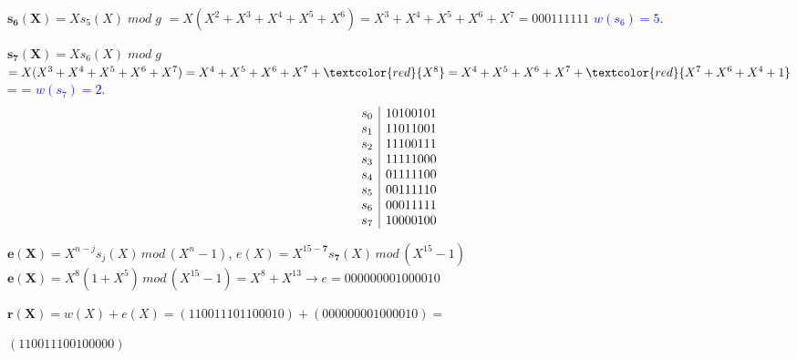 \documentclass{beamer}
\theoremstyle{plain}
\theoremstyle{example}
\theoremstyle{example}
\begin{document}
\begin{frame}  \footnotesize  

\vspace{0.3cm}
$\mathbf{s_6(X)}= X s_5 (X) \; mod \; g$
$=X(X^2+X^3+X^4+X^5+X^6)=  \boxed{X^3+X^4+X^5+X^6+X^7} =  \boxed{000111111}$ \textcolor{blue}{$w(s_6) = 5.$}

\vspace{0.3cm}
$\mathbf{s_7(X)}= X s_6 (X) \; mod \; g$
$=X(X^3+X^4+X^5+X^6+X^7)=  X^4+X^5+X^6+X^7+\textcolor{red}{X^8} =  X^4+X^5+X^6+X^7+\textcolor{red}{X^7+X^6+X^4+1}$ =  =  \textcolor{blue}{$w(s_7) = 2.$}
\[
     \begin{array}{c|c}
     			\tiny	  s_0 & 10100101\\ 
     				  s_1 & 11011001\\ 
     				  s_2 & 11100111\\ 
     				  s_3 & 11111000\\ 
     				  s_4 & 01111100\\ 
     				  s_5 & 00111110\\ 
     				  s_6 & 00011111\\ 
     				  s_7 & 10000100 
           			\end{array}
     \]
\begin{center}
$\mathbf{e(X)} =X^{n-j} s_j(X)\, mod\, (X^n-1)$, $e(X) =X^{15-\mathbf{7}} s_\mathbf{7}(X)\, mod\, (X^{15}-1)$\\
\vspace{0.2cm}
$\mathbf{e(X)} =X^8 (1+X^5) \, mod\, (X^{15}-1)= X^8 + X^{13} \rightarrow \boxed{e = 000000001000010}$

\vspace{0.2cm}

$\mathbf{r(X)}=w(X)+e(X) = (110011101100010) + (000000001000010) = $

\vspace{0.1cm}
$\boxed{(110011100100000)}$
\end{center}


\end{frame} 
\end{document}
